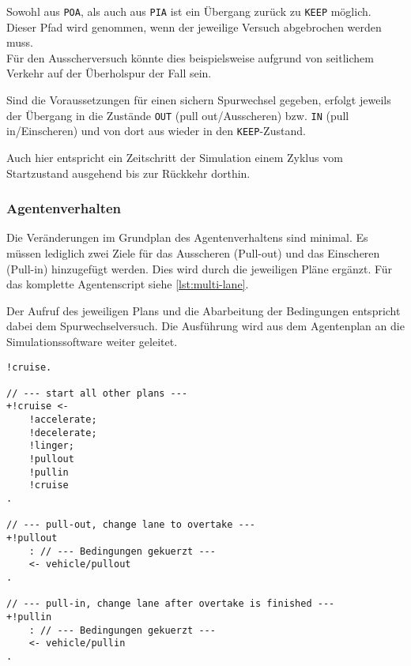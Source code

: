 Sowohl aus \texttt{POA}, als auch aus \texttt{PIA} ist ein Übergang zurück zu \texttt{KEEP} möglich.
Dieser Pfad wird genommen, wenn der jeweilige Versuch abgebrochen werden muss.
\\
Für den Ausscherversuch könnte dies beispielsweise aufgrund von seitlichem Verkehr auf der Überholspur der Fall sein.

Sind die Voraussetzungen für einen sichern Spurwechsel gegeben, erfolgt jeweils der Übergang in die Zustände \texttt{OUT} (pull out/Ausscheren) bzw. \texttt{IN} (pull in/Einscheren) und von dort aus wieder in den \texttt{KEEP}-Zustand.

Auch hier entspricht ein Zeitschritt der Simulation einem Zyklus vom Startzustand ausgehend bis zur Rückkehr dorthin.



\subsubsection{Agentenverhalten}
\label{sec:agentplan-multilane}

Die Veränderungen im Grundplan des Agentenverhaltens sind minimal. 
Es müssen lediglich zwei Ziele für das Ausscheren (Pull-out) und das Einscheren (Pull-in) hinzugefügt werden.
Dies wird durch die jeweiligen Pläne ergänzt.
Für das komplette Agentenscript siehe \cref{lst:multi-lane}.

Der Aufruf des jeweiligen Plans und die Abarbeitung der Bedingungen entspricht dabei dem Spurwechselversuch.
Die Ausführung wird aus dem Agentenplan an die Simulationssoftware weiter geleitet.

\begin{minipage}[hptb]{0.95\textwidth}
\begin{lstlisting}[style=asl, 
                   keywords={!pullout,!pullin}, 
                   keywords={[2]vehicle/pullout,vehicle/pullin}, 
                   keywords={[3]}, 
                   caption={Auszug aus Agentenscript: multi lane-Version},
                   label={lst:multilane-auszug}]      
!cruise.

// --- start all other plans ---
+!cruise <-
    !accelerate;
    !decelerate;
    !linger;
    !pullout
    !pullin
    !cruise
.

// --- pull-out, change lane to overtake ---
+!pullout
    : // --- Bedingungen gekuerzt ---
    <- vehicle/pullout
.

// --- pull-in, change lane after overtake is finished ---
+!pullin
    : // --- Bedingungen gekuerzt ---
    <- vehicle/pullin
.\end{lstlisting}
\end{minipage}

